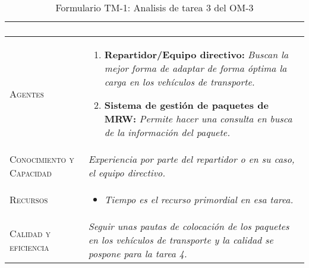\begin{table}[H]
{\begin{tabularx}{\textwidth}{|l|X|}
\begin{enumerate}
				\end{enumerate} \\
			\hline
			\textsc{Agentes} & 
				\begin{enumerate}
					\item \textbf{Repartidor/Equipo directivo:} \textit{Buscan la mejor forma de adaptar de forma óptima la carga en los vehículos de transporte.}
					\item \textbf{Sistema de gestión de paquetes de MRW:} \textit{Permite hacer una consulta en busca de la información del paquete.}
				\end{enumerate} \\
			\hline
			\textsc{Conocimiento y Capacidad} & \textit{Experiencia por parte del repartidor o en su caso, el equipo directivo.} \\
			\hline
			\textsc{Recursos} & 
				\begin{itemize}
					\item \textit{Tiempo es el recurso primordial en esa tarea.}
				\end{itemize} \\
			\hline
			\textsc{Calidad y eficiencia} & \textit{Seguir unas pautas de colocación de los paquetes en los vehículos de transporte y la calidad se pospone para la tarea 4.} \\
			\hline
		\end{tabularx}
	}
	\caption{\label{tab:TM1T3}Formulario TM-1: Analisis de tarea 3 del OM-3}
\end{table} 

